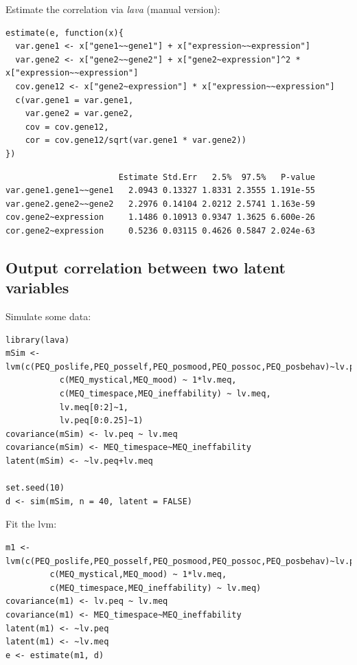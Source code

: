 \documentclass{article}
\begin{document}
Estimate the correlation via \emph{lava} (manual version):
\lstset{language=r,label= ,caption= ,captionpos=b,numbers=none}
\begin{lstlisting}
estimate(e, function(x){
  var.gene1 <- x["gene1~~gene1"] + x["expression~~expression"]
  var.gene2 <- x["gene2~~gene2"] + x["gene2~expression"]^2 * x["expression~~expression"]
  cov.gene12 <- x["gene2~expression"] * x["expression~~expression"]
  c(var.gene1 = var.gene1,
    var.gene2 = var.gene2,
    cov = cov.gene12,
    cor = cov.gene12/sqrt(var.gene1 * var.gene2))
})
\end{lstlisting}

\begin{verbatim}
                       Estimate Std.Err   2.5%  97.5%   P-value
var.gene1.gene1~~gene1   2.0943 0.13327 1.8331 2.3555 1.191e-55
var.gene2.gene2~~gene2   2.2976 0.14104 2.0212 2.5741 1.163e-59
cov.gene2~expression     1.1486 0.10913 0.9347 1.3625 6.600e-26
cor.gene2~expression     0.5236 0.03115 0.4626 0.5847 2.024e-63
\end{verbatim}

\subsection{Output correlation between two latent variables}
\label{sec:org1122d7a}

Simulate some data:
\lstset{language=r,label= ,caption= ,captionpos=b,numbers=none}
\begin{lstlisting}
library(lava)
mSim <-lvm(c(PEQ_poslife,PEQ_posself,PEQ_posmood,PEQ_possoc,PEQ_posbehav)~lv.peq,
           c(MEQ_mystical,MEQ_mood) ~ 1*lv.meq,
           c(MEQ_timespace,MEQ_ineffability) ~ lv.meq,
           lv.meq[0:2]~1,
           lv.peq[0:0.25]~1)
covariance(mSim) <- lv.peq ~ lv.meq
covariance(mSim) <- MEQ_timespace~MEQ_ineffability
latent(mSim) <- ~lv.peq+lv.meq

set.seed(10)
d <- sim(mSim, n = 40, latent = FALSE)
\end{lstlisting}

Fit the lvm:
\lstset{language=r,label= ,caption= ,captionpos=b,numbers=none}
\begin{lstlisting}
m1 <-lvm(c(PEQ_poslife,PEQ_posself,PEQ_posmood,PEQ_possoc,PEQ_posbehav)~lv.peq,
         c(MEQ_mystical,MEQ_mood) ~ 1*lv.meq,
         c(MEQ_timespace,MEQ_ineffability) ~ lv.meq)
covariance(m1) <- lv.peq ~ lv.meq
covariance(m1) <- MEQ_timespace~MEQ_ineffability
latent(m1) <- ~lv.peq
latent(m1) <- ~lv.meq
e <- estimate(m1, d)
\end{lstlisting}
\end{document}
